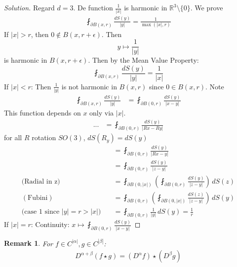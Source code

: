 \documentclass{report}
\theoremstyle{tommy}
\newtheorem{rem}[defn]{Remark}
\begin{document}
  \begin{proof}[Solution]
    Regard \(d = 3\). De function \(\frac{1}{|x|}\) is harmonic in \(\mathbb{R}^3 \setminus \{0\}\). We prove 
    \begin{align*}
      \fint_{\partial B(x, r)} \frac{dS(y)}{|y|} = \frac{1}{\max(|x|, r)}
    \end{align*}
    If \(|x| > r\), then \(0 \notin B(x,r + \epsilon)\). Then
    \[y \mapsto \frac{1}{|y|}\] is harmonic in \(B(x, r  + \epsilon)\). Then by the Mean Value Property:
    \[\fint_{\partial B(x,r)} \frac{dS(y)}{|y|} = \frac{1}{|x|}\]
    If \(|x| < r\): Then \(\frac{1}{|y|}\) is not harmonic in \(B(x,r)\) since \(0 \in B(x,r)\). Note
    \begin{align*}
      \fint_{\partial B(x,r)} \frac{d S(y)}{|y|} 
      &= \fint_{\partial B(0, r)} \frac{dS(y)}{|x-y|}
    \end{align*}
    This function depends on \(x\) only via \(|x|\). 
    \begin{align*}
      ... &= \fint_{\partial B(0,r)} \frac{dS(y)}{|Rx-Ry|}
    \end{align*}
    for all \(R\) rotation \(SO(3)\), \(dS(R_y) = dS(y)\)
    \begin{align*}
      &= \fint_{\partial B(0, r)} \frac{dS(y)}{|Rx - y|} \\
      &= \fint_{\partial B(0, r)} \frac{dS(y)}{|z - y|} \\
      \text{(Radial in z)} \quad &= \fint_{\partial B(0, |x|)} \left(\fint_{\partial B(0, r)} \frac{dS(y)}{|z-y|}\right) \, dS(z) \\
      (\text{Fubini}) \quad &= \fint_{\partial B(0,r)} \left(\fint_{\partial B(0, |x|)} \frac{dS(z)}{|z-y|}\right) \, dS(y) \\
      (\text{case 1 since \(|y| = r > |x|\))} \quad &= \fint_{\partial B(0,r)} \frac{1}{|y|} \, dS(y)
      = \frac{1}{r}
    \end{align*}
    If \(|x| = r\): Continuity: \(x \mapsto \fint_{\partial B(0, r)} \frac{dS(y)}{|x-y|}\)
  \end{proof}

  \begin{rem}
    For \(f \in C^{|\alpha|}, g \in C^{|\beta|}\):
    \begin{align*}
      D^{\alpha + \beta}(f \star g) = (D^\alpha f)\star(D^\beta g)
    \end{align*}
  \end{rem}
\end{document}
